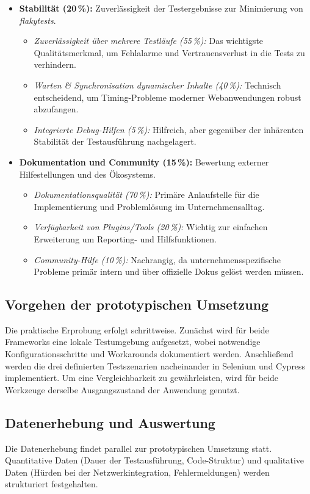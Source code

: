 \begin{itemize}
    \item \textbf{Stabilität (20\,\%):} Zuverlässigkeit der Testergebnisse zur Minimierung von \textit{\gls{flakytest}s}.
    \begin{itemize}
        \item \textit{Zuverlässigkeit über mehrere Testläufe (55\,\%):} Das wichtigste Qualitätsmerkmal, um Fehlalarme und Vertrauensverlust in die Tests zu verhindern.
        \item \textit{Warten \& Synchronisation dynamischer Inhalte (40\,\%):} Technisch entscheidend, um Timing-Probleme moderner Webanwendungen robust abzufangen.
        \item \textit{Integrierte Debug-Hilfen (5\,\%):} Hilfreich, aber gegenüber der inhärenten Stabilität der Testausführung nachgelagert.
    \end{itemize}

    \item \textbf{Dokumentation und Community (15\,\%):} Bewertung externer Hilfestellungen und des Ökosystems.
    \begin{itemize}
        \item \textit{Dokumentationsqualität (70\,\%):} Primäre Anlaufstelle für die Implementierung und Problemlösung im Unternehmensalltag.
        \item \textit{Verfügbarkeit von Plugins/Tools (20\,\%):} Wichtig zur einfachen Erweiterung um Reporting- und Hilfsfunktionen.
        \item \textit{Community-Hilfe (10\,\%):} Nachrangig, da unternehmensspezifische Probleme primär intern und über offizielle Dokus gelöst werden müssen.
    \end{itemize}
\end{itemize}


\subsection{Vorgehen der prototypischen Umsetzung}
Die praktische Erprobung erfolgt schrittweise. Zunächst wird für beide Frameworks eine lokale Testumgebung aufgesetzt, wobei notwendige Konfigurationsschritte und Workarounds dokumentiert werden. Anschließend werden die drei definierten Testszenarien nacheinander in Selenium und Cypress implementiert. Um eine Vergleichbarkeit zu gewährleisten, wird für beide Werkzeuge derselbe Ausgangszustand der Anwendung genutzt. 

\subsection{Datenerhebung und Auswertung}
Die Datenerhebung findet parallel zur prototypischen Umsetzung statt. Quantitative Daten (Dauer der Testausführung, Code-Struktur) und qualitative Daten (Hürden bei der Netzwerkintegration, Fehlermeldungen) werden strukturiert festgehalten.

